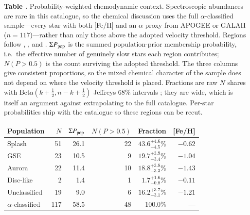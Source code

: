 \begin{center}
\label{tab:population_decomp}
\begin{minipage}{\columnwidth}
\small\textbf{Table \thetable.} Probability-weighted chemodynamic
context.  Spectroscopic abundances are rare in this catalogue, so the
chemical discussion uses the full $\alpha$-classified sample---every
star with both [Fe/H] and an $\alpha$ proxy from APOGEE or GALAH
($n=117$)---rather than only those above the adopted velocity
threshold.  Regions follow \citet{Belokurov2020}, \citet{Helmi2018},
and \citet{BelokurovKravtsov2022}.  $\Sigma P_{\rm pop}$ is the summed
population-prior membership probability, i.e.\ the effective number of
genuinely slow stars each region contributes; $N(P>0.5)$ is the count
surviving the adopted threshold.  The three columns give consistent
proportions, so the mixed chemical character of the sample does not
depend on where the velocity threshold is placed.  Fractions are raw
$N$ shares with Beta$(k+\tfrac{1}{2}, n-k+\tfrac{1}{2})$ Jeffreys
68\% intervals \citep{Cameron2011}; they are wide, which is itself an
argument against extrapolating to the full catalogue.  Per-star
probabilities ship with the catalogue so these regions can be recut.
\end{minipage}
\vspace{0.4ex}

\small
\setlength{\tabcolsep}{0pt}
\begin{tabular*}{\columnwidth}{@{\extracolsep{\fill}}lrrrrr@{}}
\hline\hline
Population & $N$ & $\Sigma P_{\rm pop}$ & $N(P>0.5)$ & Fraction & [Fe/H] \\
\hline
Splash               &  51 &  26.1 &  22 & $43.6^{+4.6}_{-4.5}\%$ & $-0.62$ \\
GSE                  &  23 &  10.5 &   9 & $19.7^{+3.9}_{-3.4}\%$ & $-1.04$ \\
Aurora               &  22 &  11.4 &  10 & $18.8^{+3.8}_{-3.3}\%$ & $-1.43$ \\
Disc-like            &   2 &   1.4 &   1 & $1.7^{+1.6}_{-0.8}\%$ & $-0.11$ \\
Unclassified         &  19 &   9.0 &   6 & $16.2^{+3.7}_{-3.1}\%$ & $-1.21$ \\
\hline
$\alpha$-classified & 117 & 58.5 & 48 & 100.0\% & --- \\
\hline
\end{tabular*}
\end{center}
